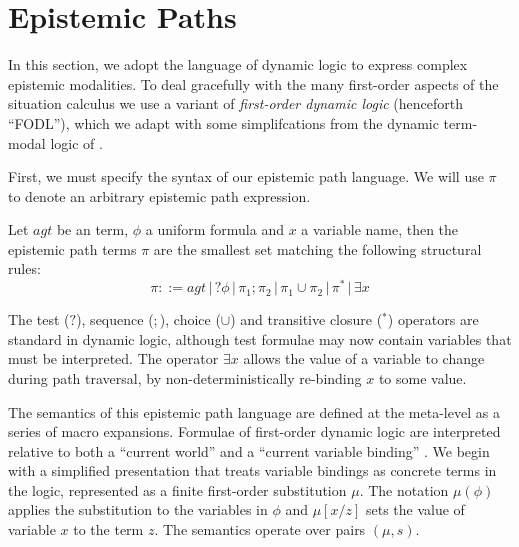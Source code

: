 \section{Epistemic Paths\label{sec:CKnowledge:Epistemic-Paths}}

In this section, we adopt the language of dynamic logic to express
complex epistemic modalities. To deal gracefully with the many first-order
aspects of the situation calculus we use a variant of \emph{first-order
dynamic logic} (henceforth {}``FODL''), which we adapt with some
simplifcations from the dynamic term-modal logic of \citet{kooi07dyn_termmodal_logic}.

First, we must specify the syntax of our epistemic path language.
We will use $\pi$ to denote an arbitrary epistemic path expression.

\begin{defnL}
 Let $agt$ be an term, $\phi$
a uniform formula and $x$ a variable name, then the epistemic path
terms $\pi$ are the smallest set matching the following structural
rules:\[
\pi::=agt\,|\,?\phi\,|\,\pi_{1};\pi_{2}\,|\,\pi_{1}\cup\pi_{2}\,|\,\pi^{*}\,|\,\exists x\]

\end{defnL}
The test ($?$), sequence ($;$), choice ($\cup$) and transitive
closure ($^{*}$) operators are standard in dynamic logic, although
test formulae may now contain variables that must be interpreted.
The operator $\exists x$ allows the value of a variable to change
during path traversal, by non-deterministically re-binding $x$ to
some value.

The semantics of this epistemic path language are defined at the meta-level
as a series of macro expansions. Formulae of first-order dynamic logic
are interpreted relative to both a {}``current world'' and a {}``current
variable binding'' \citep{kooi07dyn_termmodal_logic}. We begin with
a simplified presentation that treats variable bindings as concrete
terms in the logic, represented as a finite first-order substitution
$\mu$. The notation $\mu(\phi)$ applies the substitution to the
variables in $\phi$ and $\mu[x/z]$ sets the value of variable $x$
to the term $z$. The semantics operate over pairs $(\mu,s)$.

